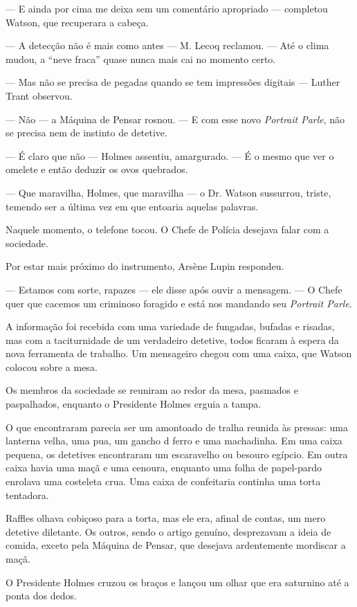 --- E ainda por cima me deixa sem um comentário apropriado --- completou
Watson, que recuperara a cabeça.

--- A detecção não é mais como antes --- M. Lecoq reclamou. --- Até o
clima mudou, a ``neve fraca'' quase nunca mais cai no momento certo.

--- Mas não se precisa de pegadas quando se tem impressões digitais ---
Luther Trant observou.

--- Não --- a Máquina de Pensar rosnou. --- E com esse novo
\emph{Portrait Parle}, não se precisa nem de instinto de detetive.

--- É claro que não --- Holmes assentiu, amargurado. --- É o mesmo que
ver o omelete e então deduzir os ovos quebrados.

--- Que maravilha, Holmes, que maravilha --- o Dr. Watson sussurrou,
triste, temendo ser a última vez em que entoaria aquelas palavras.

Naquele momento, o telefone tocou. O Chefe de Polícia desejava falar com
a sociedade.

Por estar mais próximo do instrumento, Arsène Lupin respondeu.

--- Estamos com sorte, rapazes --- ele disse após ouvir a mensagem. ---
O Chefe quer que cacemos um criminoso foragido e está nos mandando seu
\emph{Portrait Parle}.

A informação foi recebida com uma variedade de fungadas, bufadas e
risadas, mas com a taciturnidade de um verdadeiro detetive, todos
ficaram à espera da nova ferramenta de trabalho. Um mensageiro chegou
com uma caixa, que Watson colocou sobre a mesa.

Os membros da sociedade se reuniram ao redor da mesa, pasmados e
paspalhados, enquanto o Presidente Holmes erguia a tampa.

O que encontraram parecia ser um amontoado de tralha reunida às pressas:
uma lanterna velha, uma pua, um gancho d ferro e uma machadinha. Em uma
caixa pequena, os detetives encontraram um escaravelho ou besouro
egípcio. Em outra caixa havia uma maçã e uma cenoura, enquanto uma folha
de papel-pardo enrolava uma costeleta crua. Uma caixa de confeitaria
continha uma torta tentadora.

Raffles olhava cobiçoso para a torta, mas ele era, afinal de contas, um
mero detetive diletante. Os outros, sendo o artigo genuíno, desprezavam
a ideia de comida, exceto pela Máquina de Pensar, que desejava
ardentemente mordiscar a maçã.

O Presidente Holmes cruzou os braços e lançou um olhar que era saturnino
até a ponta dos dedos.

